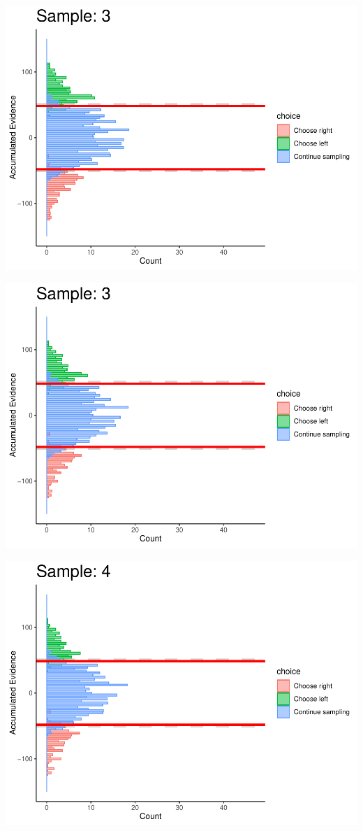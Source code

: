 \documentclass[
]{book}
\begin{document}
\begin{center}\includegraphics[width=0.8\linewidth]{LateNightBayes_files/figure-latex/fixed_dcb-28} \end{center}

\begin{center}\includegraphics[width=0.8\linewidth]{LateNightBayes_files/figure-latex/fixed_dcb-29} \end{center}

\begin{center}\includegraphics[width=0.8\linewidth]{LateNightBayes_files/figure-latex/fixed_dcb-30} \end{center}
\end{document}
